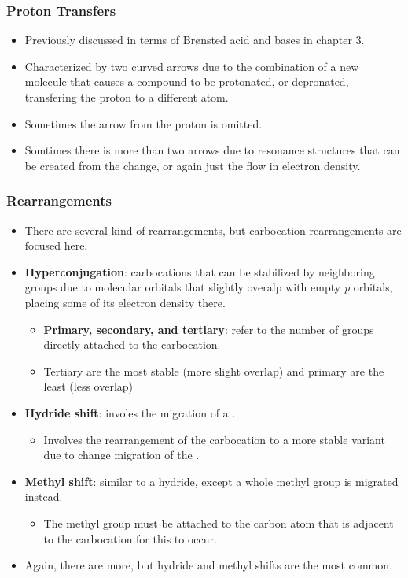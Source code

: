 \documentclass[12pt,a4paper]{article}
\begin{document}
\begin{itemize}
    \subsubsection{Proton Transfers}
    \begin{itemize}
        \item Previously discussed in terms of Br{\o}nsted acid and bases in chapter 3.
        \item Characterized by two curved arrows due to the combination of a new molecule that causes a compound to be protonated, or depronated, transfering the proton to a different atom.
        \item Sometimes the arrow from the proton is omitted.
        \item Somtimes there is more than two arrows due to resonance structures that can be created from the change, or again just the flow in electron density.
    \end{itemize}
    \subsubsection{Rearrangements}
    \begin{itemize}
        \item There are several kind of rearrangements, but carbocation rearrangements are focused here.
        \item \textbf{Hyperconjugation}: carbocations that can be stabilized by neighboring groups due to molecular orbitals that slightly overalp with empty \textit{p} orbitals, placing some of its electron density there.
            \begin{itemize}
                \item \textbf{Primary, secondary, and tertiary}: refer to the number of groups directly attached to the carbocation.
                \item Tertiary are the most stable (more slight overlap) and primary are the least (less overlap)
            \end{itemize}
        \item \textbf{Hydride shift}: involes the migration of a {\color{neg}}.
            \begin{itemize}
                \item Involves the rearrangement of the carbocation to a more stable variant due to change migration of the {\color{neg}}.
            \end{itemize}
        \item \textbf{Methyl shift}: similar to a hydride, except a whole methyl group is migrated instead.
            \begin{itemize}
                \item The methyl group must be attached to the carbon atom that is adjacent to the carbocation for this to occur.
            \end{itemize}
        \item Again, there are more, but hydride and methyl shifts are the most common.
    \end{itemize}

\end{itemize}
\end{document}
